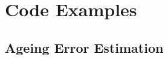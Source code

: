 \section{Code Examples}
\label{sec:codeappendix}

\subsection{Ageing Error Estimation}
\hypertarget{AgeingError}{}


